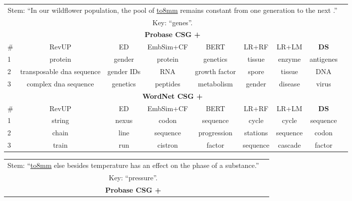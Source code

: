 \documentclass[10pt,a4paper]{article}
\begin{document}
\begin{table*}[htb!]
\begin{tabular}{lcccccccc}
			\toprule
			\toprule
			\multicolumn{8}{c}{Stem:  ``In our wildflower population, the pool of \underline{\hbox to8mm{}} remains constant from one generation to the next .''}\\
			\multicolumn{8}{c}{Key: ``{\color{blue}genes}''.} \\
			\midrule
            \multicolumn{8}{c}{\textbf{Probase CSG +}} \\
            \cline{1-8}
			\#   &RevUP &ED  & EmbSim+CF &BERT & LR+RF & LR+LM & \textbf{DS}\\
			\midrule
			1 &protein &gender &protein &genetics &tissue &enzyme &antigenes \\
			\midrule
			2 &transposable dna sequence &gender IDs &RNA &growth factor &spore &tissue &DNA\\
			\midrule
			3 &complex dna sequence &genetics &peptides  &metabolism &gender &disease &virus\\
			\midrule
			\multicolumn{8}{c}{\textbf{WordNet CSG +}} \\
            \cline{1-8}
			\#   &RevUP &ED  & EmbSim+CF &BERT & LR+RF & LR+LM & \textbf{DS}\\
			\midrule
			1 &string&nexus&codon&sequence&cycle &cycle&sequence \\
			\midrule
			2 &chain &line &sequence &progression &stations &sequence &codon\\
			\midrule
			3 &train &run &cistron  &factor&sequence&cascade&factor\\
			\bottomrule
			\bottomrule
		\end{tabular}
		\newline
		\newline
		\newline
        \begin{tabular}{lcccccccc} %
			\toprule
			\toprule
			\multicolumn{8}{c}{Stem:  ``\underline{\hbox to8mm{}} else besides temperature has an effect on the phase of a substance.''}\\
			\multicolumn{8}{c}{Key: ``{\color{blue}pressure}''.} \\
			\midrule
            \multicolumn{8}{c}{\textbf{Probase CSG +}} \\
            \cline{1-8}

\end{tabular}
\end{table*}
\end{document}
